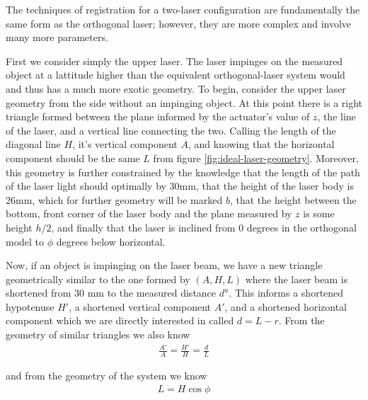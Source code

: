 The techniques of registration for a two-laser configuration are
fundamentally the same form as the orthogonal laser; however, they are
more complex and involve many more parameters.

First we consider simply the upper laser. The laser impinges on the
measured object at a lattitude higher than the equivalent
orthogonal-laser system would and thus has a much more exotic
geometry. To begin, consider the upper laser geometry from the side
without an impinging object. At this point there is a right triangle
formed between the plane informed by the actuator's value of $z$, the
line of the laser, and a vertical line connecting the two. Calling the
length of the diagonal line $H$, it's vertical component $A$, and
knowing that the horizontal component should be the same $L$ from
figure \ref{fig:ideal-laser-geometry}. Moreover, this geometry is
further constrained by the knowledge that the length of the path of
the laser light should optimally by 30mm, that the height of the laser
body is $26$mm, which for further geometry will be marked $b$, that
the height between the bottom, front corner of the laser body and the
plane measured by $z$ is some height $h/2$, and finally that the laser
is inclined from $0$ degrees in the orthogonal model to $\phi$ degrees
below horizontal.

Now, if an object is impinging on the laser beam, we have a new
triangle geometrically similar to the one formed by $(A, H, L)$ where
the laser beam is shortened from $30$ mm to the measured distance
$d^{u}$. This informs a shortened hypotenuse $H'$, a shortened
vertical component $A'$, and a shortened horizontal component which we
are directly interested in called $d = L - r$. From the geometry of
similar triangles we also know
\begin{align}
  \frac{A'}{A} = \frac{H'}{H} = \frac{d}{L}
\end{align}

and from the geometry of the system we know
\begin{align}
  L = H \cos\phi
\end{align}

